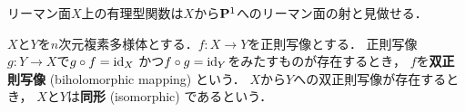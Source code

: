 リーマン面$X$上の有理型関数は$X$から$\mathbf{P}^1$へのリーマン面の射と見做せる．

\begin{Definition}
    $X$と$Y$を$n$次元複素多様体とする．$f\colon X\to Y$を正則写像とする．
    正則写像$g\colon Y\to X$で$g\circ f=\mathrm{id}_X$
    かつ$f\circ g=\mathrm{id}_Y$をみたすものが存在するとき，
    $f$を\textbf{双正則写像} (biholomorphic mapping) 
    という．
    $X$から$Y$への双正則写像が存在するとき，
    $X$と$Y$は\textbf{同形} (isomorphic) 
    であるという．
\end{Definition}
